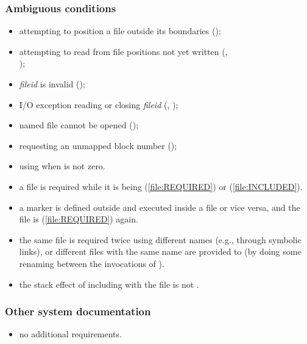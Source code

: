 \subsubsection{Ambiguous conditions} %
\begin{itemize}
\item attempting to position a file outside its boundaries
	();
\item attempting to read from file positions not yet written
	(, \\ );
\item \emph{fileid} is invalid ();
\item I/O exception reading or closing \emph{fileid}
	(,
	 );
\item named file cannot be opened
	();
\item requesting an unmapped block number
	();
\item using  when
	 is not zero.


\item a file is required while it is being 
	(\ref{file:REQUIRED}) or  (\ref{file:INCLUDED}).
\item a marker is defined outside and executed inside a file or
	vice versa, and the file is 
	(\ref{file:REQUIRED}) again.
\item the same file is required twice using different names
	(e.g., through symbolic links), or different files with the
	same name are provided to  (by doing
	some renaming between the invocations of ).
\item the stack effect of including with
	 the file is not .

\end{itemize}

\subsubsection{Other system documentation} %
\begin{itemize}
\item no additional requirements.
\end{itemize}

